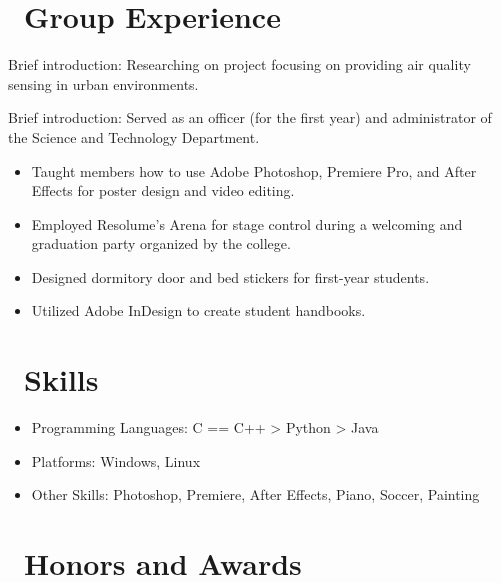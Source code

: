 \documentclass[12pt]{resume}
\begin{document}
\section{\texorpdfstring{\textbf{}\ Group Experience}{Group Experience}}
Brief introduction: Researching on project focusing on providing air quality sensing in urban environments.

Brief introduction: Served as an officer (for the first year) and administrator of the Science and Technology Department.
\begin{itemize}
  \item Taught members how to use Adobe Photoshop, Premiere Pro, and After Effects for poster design and video editing.
  \item Employed Resolume’s Arena for stage control during a welcoming and graduation party organized by the college.
  \item Designed dormitory door and bed stickers for first-year students.
  \item Utilized Adobe InDesign to create student handbooks.
\end{itemize}

\section{\texorpdfstring{\textbf{}\ Skills}{Skills}}
\begin{itemize}[parsep=0.5ex]
  \item Programming Languages: C == C++ > Python > Java
  \item Platforms: Windows, Linux
  \item Other Skills: Photoshop, Premiere, After Effects, Piano, Soccer, Painting
\end{itemize}

\section{\texorpdfstring{\textbf{}\ Honors and Awards}{Honors and Awards}}
\end{document}
